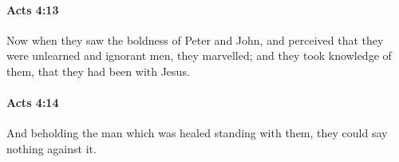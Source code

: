 		\paragraph{Acts 4:13} %
			\label{ACTS-4-13}

			Now when they saw the boldness of Peter and John, and perceived that they were unlearned and ignorant men, they marvelled; and they took knowledge of them, that they had been with Jesus.

			\begin{framed}
			\scriptsize
				\begin{compactdesc}
					\item[SBLG] 
				\end{compactdesc}
			\end{framed}

		\paragraph{Acts 4:14} %
			\label{ACTS-4-14}

			And beholding the man which was healed standing with them, they could say nothing against it.

